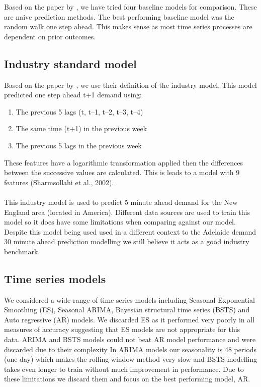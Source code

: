 \documentclass[11pt]{article}
\begin{document}
Based on the paper by \citep{kotillova_statistical_2012}, we have tried four baseline models for comparison. These are naive prediction methods. The best performing baseline model was the random walk one step ahead. This makes sense as most time series processes are dependent on prior outcomes.





\subsection{Industry standard model}

Based on the paper by \citet{kotillova_statistical_2012}, we use their definition of the industry model. This model predicted one step ahead t+1 demand using:
\begin{enumerate}
\item The previous 5 lags (t, t--1, t--2, t--3, t--4)
\item The same time (t+1) in the previous week 
\item The previous 5 lags in the previous week
\end{enumerate}

\noindent These features have a logarithmic transformation applied then the differences between the successive values are calculated. This is leads to a model with 9 features (Sharmsollahi et al., 2002).
\\
\\
This industry model is used to predict 5 minute ahead demand for the New England area (located in America). Different data sources are used to train this model so it does have some limitations when comparing against our model. Despite this model being used used in a different context to the Adelaide demand 30 minute ahead prediction modelling we still believe it acts as a good industry benchmark.

\subsection{Time series models}
We considered a wide range of time series models including Seasonal Exponential Smoothing (ES), Seasonal ARIMA, Bayesian structural time series (BSTS) and Auto regressive (AR) models. We discarded ES as it performed very poorly in all measures of accuracy suggesting that ES models are not appropriate for this data. ARIMA and BSTS models could not beat AR model performance and were discarded due to their complexity In ARIMA models our seasonality is 48 periods (one day) which makes the rolling window method very slow and BSTS modelling takes even longer to train without much improvement in performance. Due to these limitations we discard them and focus on the best performing model, AR.
\end{document}

